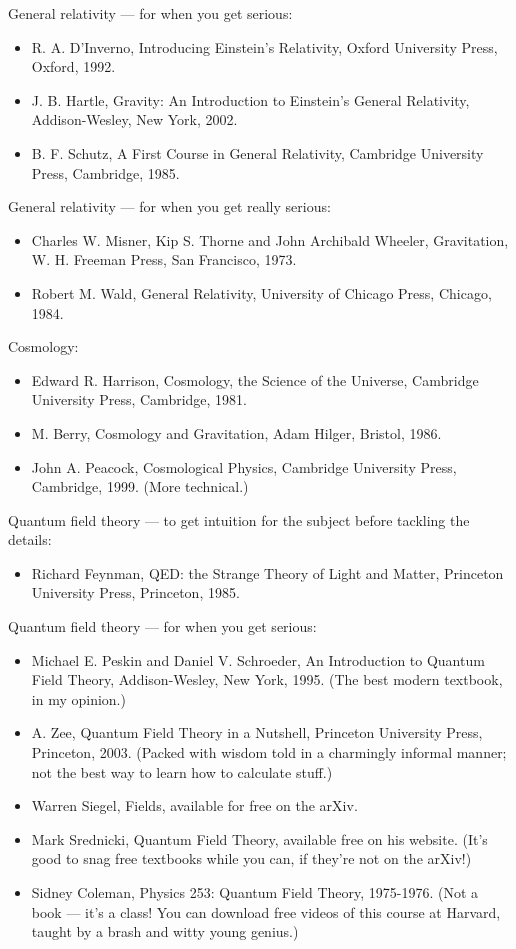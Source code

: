 \documentclass[10pt,a4paper]{book}
\theoremstyle{definition}
\begin{document}
General relativity — for when you get serious:
\begin{itemize}
\item  R. A. D'Inverno, Introducing Einstein's Relativity, Oxford University Press, Oxford, 1992.
\item J. B. Hartle, Gravity: An Introduction to Einstein's General Relativity, Addison-Wesley, New York, 2002.
\item B. F. Schutz, A First Course in General Relativity, Cambridge University Press, Cambridge, 1985.
\end{itemize}

General relativity — for when you get really serious:
\begin{itemize}
\item Charles W. Misner, Kip S. Thorne and John Archibald Wheeler, Gravitation, W. H. Freeman Press, San Francisco, 1973.
\item Robert M. Wald, General Relativity, University of Chicago Press, Chicago, 1984.
\end{itemize}

Cosmology:
\begin{itemize}
\item  Edward R. Harrison, Cosmology, the Science of the Universe, Cambridge University Press, Cambridge, 1981.
\item M. Berry, Cosmology and Gravitation, Adam Hilger, Bristol, 1986.
\item John A. Peacock, Cosmological Physics, Cambridge University Press, Cambridge, 1999. (More technical.)
\end{itemize}

Quantum field theory — to get intuition for the subject before tackling the details:
\begin{itemize}
\item  Richard Feynman, QED: the Strange Theory of Light and Matter, Princeton University Press, Princeton, 1985.
\end{itemize}

Quantum field theory — for when you get serious:
\begin{itemize}
\item  Michael E. Peskin and Daniel V. Schroeder, An Introduction to Quantum Field Theory, Addison-Wesley, New York, 1995. (The best modern textbook, in my opinion.)
\item A. Zee, Quantum Field Theory in a Nutshell, Princeton University Press, Princeton, 2003. (Packed with wisdom told in a charmingly informal manner; not the best way to learn how to calculate stuff.)
\item Warren Siegel, Fields, available for free on the arXiv.
\item Mark Srednicki, Quantum Field Theory, available free on his website. (It's good to snag free textbooks while you can, if they're not on the arXiv!)
\item Sidney Coleman, Physics 253: Quantum Field Theory, 1975-1976. (Not a book — it's a class! You can download free videos of this course at Harvard, taught by a brash and witty young genius.)
\end{itemize}
\end{document}
